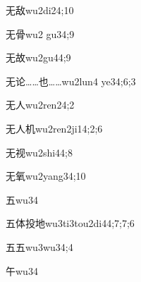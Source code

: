 \begin{verbete}{无敌}{wu2di2}{4;10}
\end{verbete}

\begin{verbete}{无骨}{wu2 gu3}{4;9}
\end{verbete}

\begin{verbete}{无故}{wu2gu4}{4;9}
\end{verbete}

\begin{verbete}{无论……也……}{wu2lun4 ye3}{4;6;3}
\end{verbete}

\begin{verbete}{无人}{wu2ren2}{4;2}
\end{verbete}

\begin{verbete}{无人机}{wu2ren2ji1}{4;2;6}
\end{verbete}

\begin{verbete}{无视}{wu2shi4}{4;8}
\end{verbete}

\begin{verbete}{无氧}{wu2yang3}{4;10}
\end{verbete}

\begin{verbete}{五}{wu3}{4}
\end{verbete}

\begin{verbete}{五体投地}{wu3ti3tou2di4}{4;7;7;6}
\end{verbete}

\begin{verbete}{五五}{wu3wu3}{4;4}
\end{verbete}

\begin{verbete}{午}{wu3}{4}
\end{verbete}

